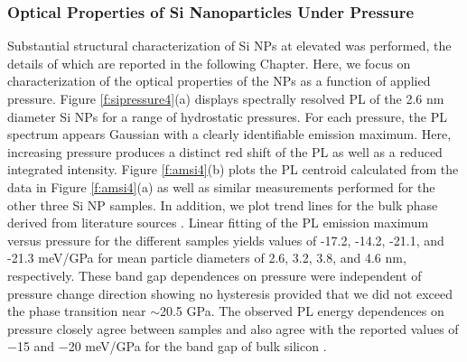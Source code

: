 \subsubsection{Optical Properties of Si Nanoparticles Under Pressure} 
Substantial structural characterization of Si NPs at elevated was performed, the details of which are reported in the following Chapter.  Here, we focus on characterization of the optical properties of the NPs as a function of applied pressure.  Figure \ref{f:sipressure4}(a) displays spectrally resolved PL of the 2.6 nm diameter Si NPs for a range of hydrostatic pressures.  For each pressure, the PL spectrum appears Gaussian with a clearly identifiable emission maximum. Here, increasing pressure produces a distinct red shift of the PL as well as a reduced integrated intensity. Figure \ref{f:amsi4}(b) plots the PL centroid calculated from the data in Figure \ref{f:amsi4}(a) as well as similar measurements performed for the other three Si NP samples. In addition, we plot trend lines for the bulk phase derived from literature sources \cite{PhysRev.98.1755, slykhouse1958effect}.  Linear fitting of the PL emission maximum versus pressure for the different samples yields values of -17.2, -14.2, -21.1, and -21.3 meV/GPa for mean particle diameters of 2.6, 3.2, 3.8, and 4.6 nm, respectively. These band gap dependences on pressure were independent of pressure change direction showing no hysteresis provided that we did not exceed the phase transition near $\sim$20.5 GPa. The observed PL energy dependences on pressure closely agree between samples and also agree with the reported values of −15 and −20 meV/GPa for the band gap of bulk silicon \cite{PhysRev.98.1755, slykhouse1958effect, welber1975dependence}. 

